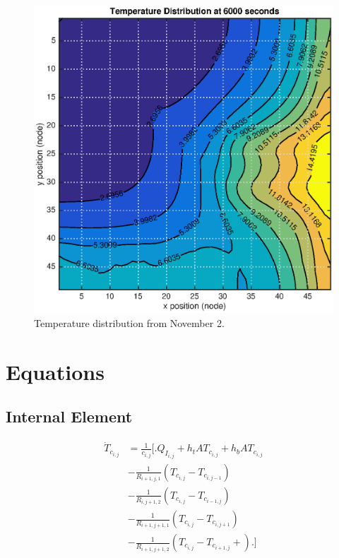 \documentclass[10pt,twocolumn]{article}
\begin{document}
\begin{figure}
	\center
	\includegraphics[width=0.8\linewidth]{Nov2Dist,it0,pi150.eps}
	\caption{Temperature distribution from November 2.}
	\label{fig:Nov2Dist,it0,pi150}
\end{figure}

\twocolumn
\section{Equations}
\subsection{Internal Element}
\begin{equation}
\begin{split}
\dot{T}_{c_{i,j}} 	& = \frac{1}{c_{i,j}}
					\Biggl[\Biggr.
					 	Q_{I_{i,j}} + h_{t}AT_{c_{i,j}} + h_{b}AT_{c_{i,j}} \\					
					&	- \frac{1}{R_{i+1,j,1}}\left(T_{c_{i,j}}- T_{c_{i,j-1}}\right) \\
					& 	- \frac{1}{R_{i,j+1,2}}\left(T_{c_{i,j}}- T_{c_{i-1,j}}\right) \\
					& 	- \frac{1}{R_{i+1,j+1,1}}\left(T_{c_{i,j}}- T_{c_{i,j+1}}\right) \\
					& 	- \frac{1}{R_{i+1,j+1,2}}\left(T_{c_{i,j}}- T_{c_{i+1,j}} + \right)
					\Biggl.\Biggl]
\end{split}
\end{equation}
\end{document}
